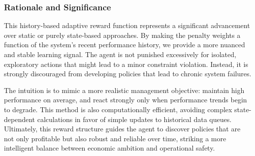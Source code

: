 \subsubsection{Rationale and Significance}
This history-based adaptive reward function represents a significant advancement over static or purely state-based approaches. By making the penalty weights a function of the system's recent performance history, we provide a more nuanced and stable learning signal. The agent is not punished excessively for isolated, exploratory actions that might lead to a minor constraint violation. Instead, it is strongly discouraged from developing policies that lead to chronic system failures.

The intuition is to mimic a more realistic management objective: maintain high performance on average, and react strongly only when performance trends begin to degrade. This method is also computationally efficient, avoiding complex state-dependent calculations in favor of simple updates to historical data queues. Ultimately, this reward structure guides the agent to discover policies that are not only profitable but also robust and reliable over time, striking a more intelligent balance between economic ambition and operational safety.